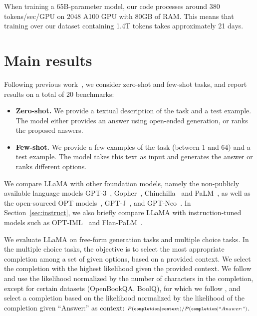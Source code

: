 \documentclass[11pt]{article}
\newcommand{\model}{LLaMA\xspace}
\begin{document}
When training a 65B-parameter model, our code processes around 380 tokens/sec/GPU on 2048 A100 GPU with 80GB of RAM.
This means that training over our dataset containing 1.4T tokens takes approximately 21 days.

\section{Main results}
Following previous work~\citep{brown2020gpt3}, we consider zero-shot and few-shot tasks, and report results on a total of 20 benchmarks:
\begin{itemize}
\item\textbf{Zero-shot.}
We provide a textual description of the task and a test example.
The model either provides an answer using open-ended generation, or ranks the proposed answers.
\item\textbf{Few-shot.} 
We provide a few examples of the task (between 1 and 64) and a test example. The model takes this text as input and generates the answer or ranks different options.
\end{itemize}

We compare \model with other foundation models, namely the non-publicly available language models GPT-3~\citep{brown2020gpt3}, Gopher~\citep{rae2021goepher}, Chinchilla~\citep{hoffmann2022chinchilla} and PaLM~\citep{chowdhery2022palm}, as well as the open-sourced OPT models~\citep{zhang2022opt}, GPT-J~\citep{gptj}, and GPT-Neo~\citep{black2022gpt}.
In Section~\ref{sec:instruct}, we also briefly compare \model with instruction-tuned models such as OPT-IML~\cite{iyer2022opt} and Flan-PaLM~\cite{Chung2022ScalingIL}.

We evaluate \model on free-form generation tasks and multiple choice tasks.
In the multiple choice tasks, the objective is to select the most appropriate completion among a set of given options, based on a provided context.
We select the completion with the highest likelihood given the provided context.
We follow \citet{eval-harness} and use the likelihood normalized by the number of characters in the completion, except for certain datasets (OpenBookQA, BoolQ), for which we follow \citet{brown2020gpt3}, and select a completion based on the likelihood normalized by the likelihood of the completion given ``Answer:'' as context: ${\scriptstyle P ( \mathtt{completion} \mid \mathtt{context})/P(\mathtt{completion} \mid ``Answer:" ) }$.
\end{document}
